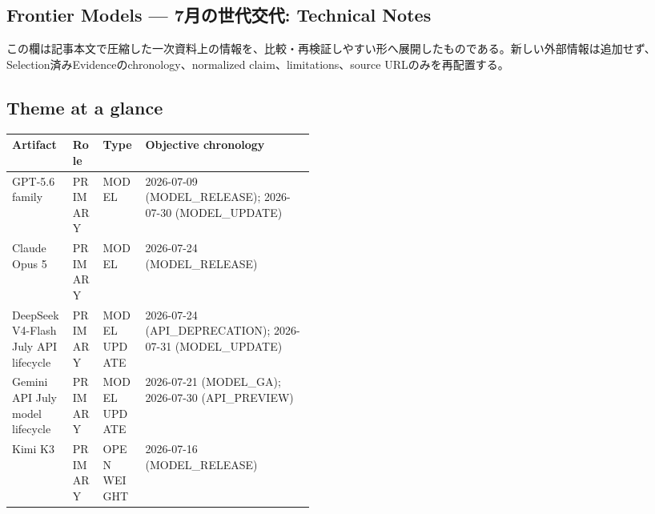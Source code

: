 \clearpage
{}
\subsection*{Frontier Models — 7月の世代交代: Technical Notes}
この欄は記事本文で圧縮した一次資料上の情報を、比較・再検証しやすい形へ展開したものである。新しい外部情報は追加せず、Selection済みEvidenceのchronology、normalized claim、limitations、source URLのみを再配置する。
\medskip
\subsection*{Theme at a glance}
\begin{center}
\footnotesize
\begin{tabularx}{\linewidth}{@{}p{0.20\linewidth}p{0.10\linewidth}p{0.14\linewidth}X@{}}
\toprule
Artifact & Role & Type & Objective chronology \\
\midrule
GPT-5.6 family & PRIMARY & MODEL & 2026-07-09 (MODEL\_RELEASE); 2026-07-30 (MODEL\_UPDATE) \\
Claude Opus 5 & PRIMARY & MODEL & 2026-07-24 (MODEL\_RELEASE) \\
DeepSeek V4-Flash July API lifecycle & PRIMARY & MODEL UPDATE & 2026-07-24 (API\_DEPRECATION); 2026-07-31 (MODEL\_UPDATE) \\
Gemini API July model lifecycle & PRIMARY & MODEL UPDATE & 2026-07-21 (MODEL\_GA); 2026-07-30 (API\_PREVIEW) \\
Kimi K3 & PRIMARY & OPEN WEIGHT & 2026-07-16 (MODEL\_RELEASE) \\
\bottomrule
\end{tabularx}
\end{center}
\normalsize

